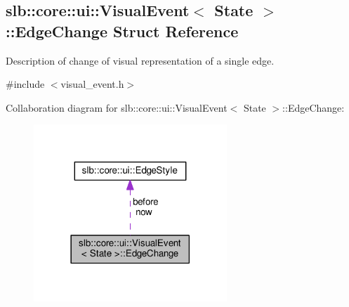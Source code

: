 \hypertarget{structslb_1_1core_1_1ui_1_1VisualEvent_1_1EdgeChange}{}\subsection{slb\+:\+:core\+:\+:ui\+:\+:Visual\+Event$<$ State $>$\+:\+:Edge\+Change Struct Reference}
\label{structslb_1_1core_1_1ui_1_1VisualEvent_1_1EdgeChange}


Description of change of visual representation of a single edge.  




{\ttfamily \#include $<$visual\+\_\+event.\+h$>$}



Collaboration diagram for slb\+:\+:core\+:\+:ui\+:\+:Visual\+Event$<$ State $>$\+:\+:Edge\+Change\+:\nopagebreak
\begin{figure}[H]
\begin{center}
\leavevmode
\includegraphics[width=206pt]{structslb_1_1core_1_1ui_1_1VisualEvent_1_1EdgeChange__coll__graph}
\end{center}
\end{figure}
